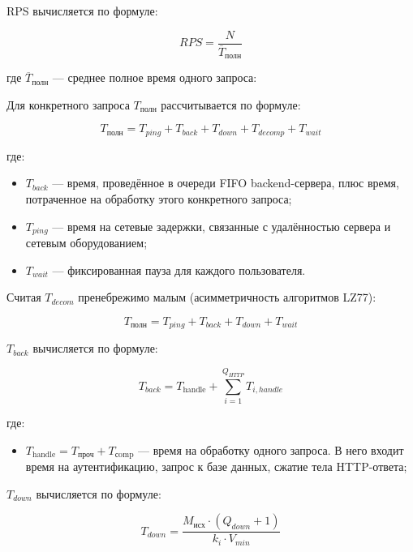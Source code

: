 \documentclass[12pt]{article}
\begin{document}
RPS вычисляется по формуле:

\[
    RPS = \frac{N}{\overline{T}_{\text{полн}}}
\]

где $\overline{T}_{\text{полн}}$ — среднее полное время одного запроса:

Для конкретного запроса $T_{\text{полн}}$ рассчитывается по формуле:

\begin{equation}
    T_{\text{полн}} = T_{ping} + T_{back} + T_{down} + T_{decomp} + T_{wait}
    \label{eq:t_full_base}
\end{equation}

где:

\begin{itemize}
    \item $T_{back}$ — время, проведённое в очереди FIFO backend-сервера, плюс время, потраченное на обработку этого конкретного запроса;
    \item $T_{ping}$ — время на сетевые задержки, связанные с удалённостью сервера и сетевым оборудованием;
    \item $T_{wait}$ — фиксированная пауза для каждого пользователя.
\end{itemize}

Считая $T_{decom}$ пренебрежимо малым (асимметричность алгоритмов LZ77):

\begin{equation}
    T_{\text{полн}} = T_{ping} + T_{back} + T_{down} + T_{wait}
\end{equation}

$T_{back}$ вычисляется по формуле:

\begin{equation}
    T_{back} = T_{\text{handle}} + \sum_{i=1}^{Q_{HTTP}}T_{i, handle}
\end{equation}

где:

\begin{itemize}
    \item $T_{\text{handle}} = T_{\text{проч}} + T_{\text{сomp}}$ — время на обработку одного запроса.
          В него входит время на аутентификацию, запрос к базе данных, сжатие тела HTTP-ответа;
\end{itemize}

$T_{down}$ вычисляется по формуле:

\begin{equation}
    T_{down} = \frac{M_{\text{исх}}\cdot(Q_{down} + 1)}{k_{i} \cdot V_{min}}
\end{equation}
\end{document}
